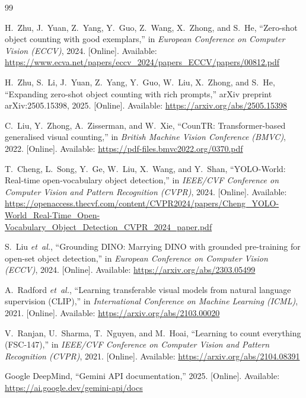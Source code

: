\documentclass[a4paper,12pt]{report}
\numberwithin{figure}{chapter}
\numberwithin{table}{chapter}
\begin{document}

\begin{thebibliography}{99}

H.~Zhu, J.~Yuan, Z.~Yang, Y.~Guo, Z.~Wang, X.~Zhong, and S.~He,
``Zero-shot object counting with good exemplars,''
in \emph{European Conference on Computer Vision (ECCV)}, 2024.
[Online]. Available:
\url{https://www.ecva.net/papers/eccv_2024/papers_ECCV/papers/00812.pdf}

H.~Zhu, S.~Li, J.~Yuan, Z.~Yang, Y.~Guo, W.~Liu, X.~Zhong, and S.~He,
``Expanding zero-shot object counting with rich prompts,''
arXiv preprint arXiv:2505.15398, 2025.
[Online]. Available:
\url{https://arxiv.org/abs/2505.15398}

C.~Liu, Y.~Zhong, A.~Zisserman, and W.~Xie,
``CounTR: Transformer-based generalised visual counting,''
in \emph{British Machine Vision Conference (BMVC)}, 2022.
[Online]. Available:
\url{https://pdf-files.bmvc2022.org/0370.pdf}

T.~Cheng, L.~Song, Y.~Ge, W.~Liu, X.~Wang, and Y.~Shan,
``YOLO-World: Real-time open-vocabulary object detection,''
in \emph{IEEE/CVF Conference on Computer Vision and Pattern
Recognition (CVPR)}, 2024.
[Online]. Available:
\url{https://openaccess.thecvf.com/content/CVPR2024/papers/Cheng_YOLO-World_Real-Time_Open-Vocabulary_Object_Detection_CVPR_2024_paper.pdf}

S.~Liu \emph{et~al.},
``Grounding DINO: Marrying DINO with grounded pre-training
for open-set object detection,''
in \emph{European Conference on Computer Vision (ECCV)}, 2024.
[Online]. Available:
\url{https://arxiv.org/abs/2303.05499}

A.~Radford \emph{et~al.},
``Learning transferable visual models from natural language
supervision (CLIP),''
in \emph{International Conference on Machine Learning (ICML)},
2021.
[Online]. Available:
\url{https://arxiv.org/abs/2103.00020}

V.~Ranjan, U.~Sharma, T.~Nguyen, and M.~Hoai,
``Learning to count everything (FSC-147),''
in \emph{IEEE/CVF Conference on Computer Vision and Pattern
Recognition (CVPR)}, 2021.
[Online]. Available:
\url{https://arxiv.org/abs/2104.08391}

Google DeepMind, ``Gemini API documentation,'' 2025.
[Online]. Available:
\url{https://ai.google.dev/gemini-api/docs}


\end{thebibliography}
\end{document}
